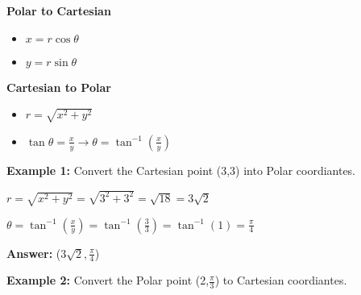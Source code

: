 \documentclass[10pt]{article}                               %
\begin{document}
\begin{tcolorbox}
\begin{adjustwidth}{2em}{0pt}
\begin{adjustwidth}{2em}{0pt}
\begin{tcolorbox}[enhanced, colback=white, colframe=black, boxrule=0.5pt]
            \end{tcolorbox}


            \vspace{0.5em}

            \textbf{Polar to Cartesian}

            \begin{itemize}
                \item \( x = r\cos\theta \)
                \item \( y = r\sin\theta \)
            \end{itemize}

            \vspace{0.5em}

            \textbf{Cartesian to Polar}

            \begin{itemize}
                \item \( r = \sqrt{x^2 + y^2} \)
                \item \( \tan\theta = \frac{x}{y}  \rightarrow  \theta = \tan^{-1}\left(\frac{x}{y}\right) \)
            \end{itemize}

            \vspace{0.5em}


            \begin{tcolorbox}

                \textbf{Example 1:} Convert the Cartesian point (3,3) into Polar coordiantes.
                \vspace{0.5em}

                \begin{adjustwidth}{2em}{0pt}

                    \( r = \sqrt{x^2 + y^2} = \sqrt{3^2 + 3^2} = \sqrt{18} = 3\sqrt{2} \)

                    \( \theta = \tan^{-1}\left(\frac{x}{y}\right) = \tan^{-1}\left(\frac{3}{3}\right) = \tan^{-1}(1) = \frac{\pi}{4} \)

                    \textbf{Answer:} (\( 3\sqrt{2}, \frac{\pi}{4} \))

                \end{adjustwidth}

                \vspace{1em}

                \textbf{Example 2:} Convert the Polar point (2,\( \frac{\pi}{3} \)) to Cartesian coordiantes.
                \vspace{0.5em}


\end{tcolorbox}
\end{adjustwidth}
\end{adjustwidth}
\end{tcolorbox}
\end{document}
